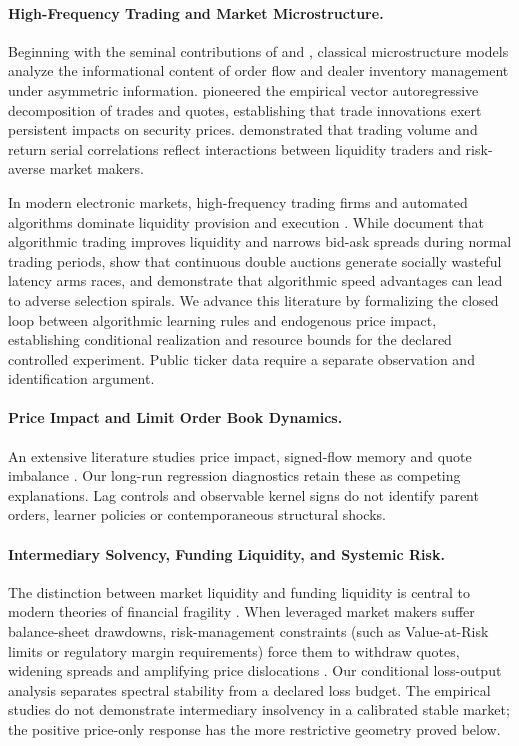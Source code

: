 \documentclass[12pt]{article}
\theoremstyle{definition}
\theoremstyle{remark}
\begin{document}
\paragraph{High-Frequency Trading and Market Microstructure.}
Beginning with the seminal contributions of \citet{kyle1985continuous} and \citet{glosten1985bid}, classical microstructure models analyze the informational content of order flow and dealer inventory management under asymmetric information. \citet{hasbrouck1991} pioneered the empirical vector autoregressive decomposition of trades and quotes, establishing that trade innovations exert persistent impacts on security prices. \citet{campbell1993trading} demonstrated that trading volume and return serial correlations reflect interactions between liquidity traders and risk-averse market makers.

In modern electronic markets, high-frequency trading firms and automated algorithms dominate liquidity provision and execution \citep{menkveld2013,budish2015,biais2015}. While \citet{hendershott2011does} document that algorithmic trading improves liquidity and narrows bid-ask spreads during normal trading periods, \citet{budish2015} show that continuous double auctions generate socially wasteful latency arms races, and \citet{biais2015} demonstrate that algorithmic speed advantages can lead to adverse selection spirals. We advance this literature by formalizing the closed loop between algorithmic learning rules and endogenous price impact, establishing conditional realization and resource bounds for the declared controlled experiment. Public ticker data require a separate observation and identification argument.

\paragraph{Price Impact and Limit Order Book Dynamics.}
An extensive literature studies price impact, signed-flow memory and quote imbalance \citep{bouchaud2004fluctuations,cont2014}. Our long-run regression diagnostics retain these as competing explanations. Lag controls and observable kernel signs do not identify parent orders, learner policies or contemporaneous structural shocks.

\paragraph{Intermediary Solvency, Funding Liquidity, and Systemic Risk.}
The distinction between market liquidity and funding liquidity is central to modern theories of financial fragility \citep{brunnermeier2009,adrian2010liquidity,he2013intermediary}. When leveraged market makers suffer balance-sheet drawdowns, risk-management constraints (such as Value-at-Risk limits or regulatory margin requirements) force them to withdraw quotes, widening spreads and amplifying price dislocations \citep{greenwood2015vulnerable,eisenberg2001systemic}. Our conditional loss-output analysis separates spectral stability from a declared loss budget. The empirical studies do not demonstrate intermediary insolvency in a calibrated stable market; the positive price-only response has the more restrictive geometry proved below.
\end{document}
